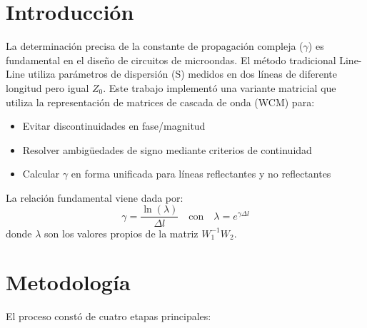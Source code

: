\documentclass{article}   %
\theoremstyle{mytheoremstyle}
\theoremstyle{mytheoremstyle}
\theoremstyle{myproblemstyle}
\begin{document}
    \noindent\begin{minipage}{0.49\textwidth}   %
        {\centering\section*{\large Introducción}}

        La determinación precisa de la constante de propagación compleja ($\gamma$) es fundamental en el diseño de circuitos de microondas. El método tradicional Line-Line utiliza parámetros de dispersión (S) medidos en dos líneas de diferente longitud pero igual $Z_0$. Este trabajo implementó una variante matricial que utiliza la representación de matrices de cascada de onda (WCM) para:
        
        \begin{itemize}
            \item Evitar discontinuidades en fase/magnitud
            \item Resolver ambigüedades de signo mediante criterios de continuidad
            \item Calcular $\gamma$ en forma unificada para líneas reflectantes y no reflectantes
        \end{itemize}

        La relación fundamental viene dada por:
        \begin{equation}
            \gamma = \frac{\ln(\lambda)}{\Delta l} \quad \text{con} \quad \lambda = e^{\gamma \Delta l}
            \label{eq:gamma}
        \end{equation}
        donde $\lambda$ son los valores propios de la matriz $W_1^{-1}W_2$.

        {\centering\section*{\large Metodología}}

        El proceso constó de cuatro etapas principales:


\end{minipage}
\end{document}
